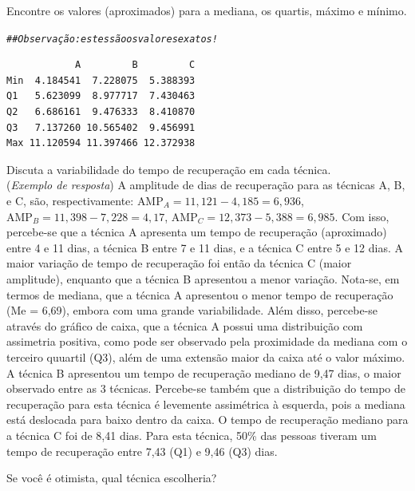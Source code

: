 \documentclass[a4paper,11pt,fleqn]{article}\usepackage[]{graphicx}\usepackage[]{color}
\makeatletter
\newcommand{\hlcom}[1]{\textcolor[rgb]{0.4,0.4,0.4}{\textit{#1}}}%
\newenvironment{kframe}{%
 \def\at@end@of@kframe{}%
 \ifinner\ifhmode%
  \def\at@end@of@kframe{\end{minipage}}%
  \begin{minipage}{\columnwidth}%
 \fi\fi%
 \def\FrameCommand##1{\hskip\@totalleftmargin \hskip-\fboxsep
 \colorbox{shadecolor}{##1}\hskip-\fboxsep
     \hskip-\linewidth \hskip-\@totalleftmargin \hskip\columnwidth}%
 \MakeFramed {\advance\hsize-\width
   \@totalleftmargin\z@ \linewidth\hsize
   \@setminipage}}%
 {\par\unskip\endMakeFramed%
 \at@end@of@kframe}
\newenvironment{knitrout}{}{} %
\theoremstyle{definition}
\makeatother
\begin{document}
\begin{compactenum}[5.]
\begin{knitrout}
\end{knitrout}
\begin{compactenum}
\item Encontre os valores (aproximados) para a mediana, os quartis,
  máximo e mínimo.
\begin{knitrout}\small
{}\color{fgcolor}\begin{kframe}
\begin{alltt}
\hlcom{## Observação: estes são os valores exatos!}
\end{alltt}
\begin{verbatim}
            A         B         C
Min  4.184541  7.228075  5.388393
Q1   5.623099  8.977717  7.430463
Q2   6.686161  9.476333  8.410870
Q3   7.137260 10.565402  9.456991
Max 11.120594 11.397466 12.372938
\end{verbatim}
\end{kframe}
\end{knitrout}
\item Discuta a variabilidade do tempo de recuperação em cada técnica. \\
  (\textit{Exemplo de resposta}) A amplitude de dias de recuperação para
  as técnicas A, B, e C, são, respectivamente: $\text{AMP}_{A} = 11,121
  - 4,185 = 6,936$, $\text{AMP}_{B} = 11,398 - 7,228 = 4,17$,
  $\text{AMP}_{C} = 12,373 - 5,388 = 6,985$. Com isso, percebe-se que a
  técnica A apresenta um tempo de recuperação (aproximado) entre 4 e 11
  dias, a técnica B entre 7 e 11 dias, e a técnica C entre 5 e 12
  dias. A maior variação de tempo de recuperação foi então da técnica C
  (maior amplitude), enquanto que a técnica B apresentou a menor
  variação. Nota-se, em termos de mediana, que a técnica A apresentou o
  menor tempo de recuperação (Me = 6,69), embora com uma grande
  variabilidade. Além disso, percebe-se através do gráfico de caixa, que
  a técnica A possui uma distribuição com assimetria positiva, como pode
  ser observado pela proximidade da mediana com o terceiro quuartil
  (Q3), além de uma extensão maior da caixa até o valor máximo. A
  técnica B apresentou um tempo de recuperação mediano de 9,47 dias, o
  maior observado entre as 3 técnicas. Percebe-se também que a
  distribuição do tempo de recuperação para esta técnica é levemente
  assimétrica à esquerda, pois a mediana está deslocada para baixo
  dentro da caixa. O tempo de recuperação mediano para a técnica C foi
  de 8,41 dias. Para esta técnica, 50\% das pessoas tiveram um tempo de
  recuperação entre 7,43 (Q1) e 9,46 (Q3) dias.
\item Se você é otimista, qual técnica escolheria?
\end{compactenum}
\end{compactenum}
\end{document}
